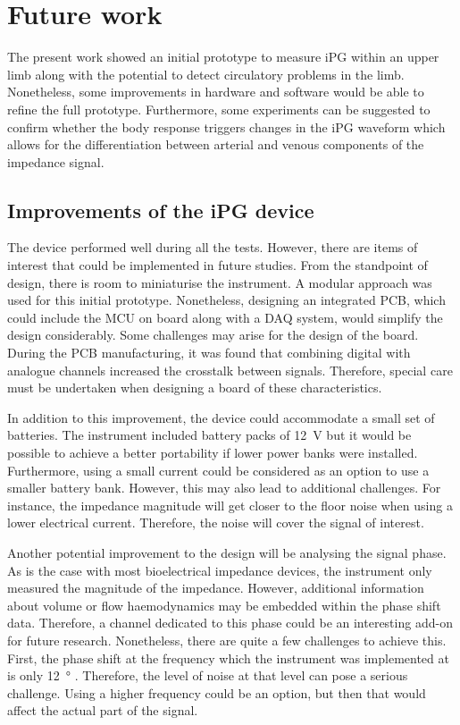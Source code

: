 \section{Future work}
The present work showed an initial prototype to measure iPG within an upper limb along with the potential to detect circulatory problems in the limb. Nonetheless, some improvements in hardware and software would be able to refine the full prototype. Furthermore, some experiments can be suggested to confirm whether the body response triggers changes in the iPG waveform which allows for the differentiation between arterial and venous components of the impedance signal. 

\subsection{Improvements of the iPG device}
The device performed well during all the tests. However, there are items of interest that could be implemented in future studies. From the standpoint of design, there is room to miniaturise the instrument. A modular approach was used for this initial prototype. Nonetheless, designing an integrated PCB, which could include the MCU on board along with a  DAQ system, would simplify the design considerably. Some challenges may arise for the design of the board. During the PCB manufacturing, it was found that combining digital with analogue channels increased the crosstalk between signals. Therefore, special care must be undertaken when designing a board of these characteristics. 

In addition to this improvement, the device could accommodate a small set of batteries. The instrument included battery packs of \SI{12}{\volt} but it would be possible to achieve a better portability if lower power banks were installed. Furthermore, using a small current could be considered as an option to use a smaller battery bank. However, this may also lead to additional challenges. For instance, the impedance magnitude will get closer to the floor noise when using a lower electrical current. Therefore, the noise will cover the signal of interest. 

Another potential improvement to the design will be analysing the signal phase. As is the case with most bioelectrical impedance devices, the instrument only measured the magnitude of the impedance. However, additional information about volume or flow haemodynamics may be embedded within the phase shift data. Therefore, a channel dedicated to this phase could be an interesting add-on for future research. Nonetheless, there are quite a few challenges to achieve this. First, the phase shift at the frequency which the instrument was implemented at is only \SI{12}{\degree} \cite{jaffrin1979quantitative}. Therefore, the level of noise at that level can pose a serious challenge. Using a higher frequency could be an option, but then that would affect the actual part of the signal.

